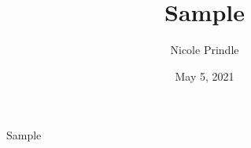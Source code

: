 \documentclass{article}
\title{Sample}
\author{Nicole Prindle}
\date{May 5, 2021}
\begin{document}
\maketitle

Sample
\end{document}

